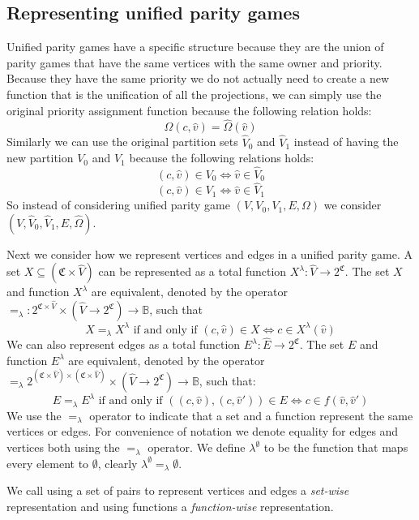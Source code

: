 \subsection{Representing unified parity games}
Unified parity games have a specific structure because they are the union of parity games that have the same vertices with the same owner and priority. Because they have the same priority we do not actually need to create a new function that is the unification of all the projections, we can simply use the original priority assignment function because the following relation holds:
\[ \Omega(c,\hat{v}) = \hat{\Omega}(\hat{v}) \]
Similarly we can use the original partition sets $\hat{V}_0$ and $\hat{V}_1$ instead of having the new partition $V_0$ and $V_1$ because the following relations holds:
\[ (c,\hat{v}) \in V_0 \iff \hat{v}\in \hat{V}_0 \]
\[ (c,\hat{v}) \in V_1 \iff \hat{v}\in \hat{V}_1 \]
So instead of considering unified parity game $(V,V_0,V_1,E,\Omega)$ we consider $(V,\hat{V}_0,\hat{V}_1,E,\hat{\Omega})$. 

Next we consider how we represent vertices and edges in a unified parity game. A set $X \subseteq (\mathfrak{C} \times \hat{V})$ can be represented as a total function $X^\lambda : \hat{V} \rightarrow 2^\mathfrak{C}$. The set $X$ and function $X^\lambda$ are equivalent, denoted by the operator $=_\lambda: 2^{\mathfrak{C} \times \hat{V}} \times (\hat{V} \rightarrow 2^\mathfrak{C}) \rightarrow \mathbb{B}$, such that
\[ X =_\lambda X^\lambda \text{ if and only if } (c,\hat{v}) \in X \iff c \in X^\lambda(\hat{v}) \]
We can also represent edges as a total function $E^\lambda : \hat{E} \rightarrow 2^\mathfrak{C}$. The set $E$ and function $E^\lambda$ are equivalent, denoted by the operator $=_\lambda 2^{(\mathfrak{C} \times \hat{V}) \times(\mathfrak{C} \times \hat{V})} \times (\hat{V} \rightarrow 2^\mathfrak{C}) \rightarrow \mathbb{B}$, such that:
\[ E =_\lambda E^\lambda \text{ if and only if } ((c,\hat{v}),(c,\hat{v}')) \in E \iff c \in f(\hat{v},\hat{v}') \]
We use the $=_\lambda$ operator to indicate that a set and a function represent the same vertices or edges. For convenience of notation we denote equality for edges and vertices both using the $=_\lambda$ operator. We define $\lambda^\emptyset$ to be the function that maps every element to $\emptyset$, clearly $\lambda^\emptyset =_\lambda \emptyset$. 

We call using a set of pairs to represent vertices and edges a \textit{set-wise} representation and using functions a \textit{function-wise} representation.

